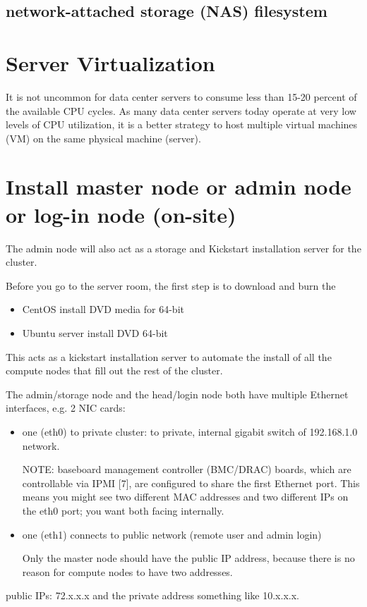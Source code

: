 \subsection{network-attached storage (NAS) filesystem}

\section{Server Virtualization}

It is not uncommon for data center servers to consume less than 15-20 percent of
the available CPU cycles. As many data center servers today operate at very low
levels of CPU utilization, it is a better strategy to host multiple virtual
machines (VM) on the same physical machine (server).

\section{Install master node or admin node or log-in node (on-site)}
\label{sec:node-master}

The admin node will also act as a storage and Kickstart installation server
for the cluster. 

Before you go to the server room, the first step is to download and burn the
\begin{itemize}
  \item CentOS install DVD media for 64-bit
  
  
  \item Ubuntu server install DVD 64-bit 
\end{itemize}
This acts as a kickstart installation server to automate the install of all the
compute nodes that fill out the rest of the cluster.

The admin/storage node and the head/login node both have multiple Ethernet
interfaces, e.g. 2 NIC cards:
\begin{itemize}
  \item one (eth0) to private cluster: to private, internal gigabit switch of
  192.168.1.0 network.

NOTE:  baseboard management controller (BMC/DRAC) boards, which are controllable
via IPMI [7], are configured to share the first Ethernet port. This means you
might see two different MAC addresses and two different IPs on the eth0 port;
you want both facing internally.


  \item one (eth1) connects to public network (remote user and admin login)

Only the master node should have the public IP address, because there is no
reason for compute nodes to have two addresses.
  
\end{itemize}
public IPs: 72.x.x.x and the private address something like 10.x.x.x. 

